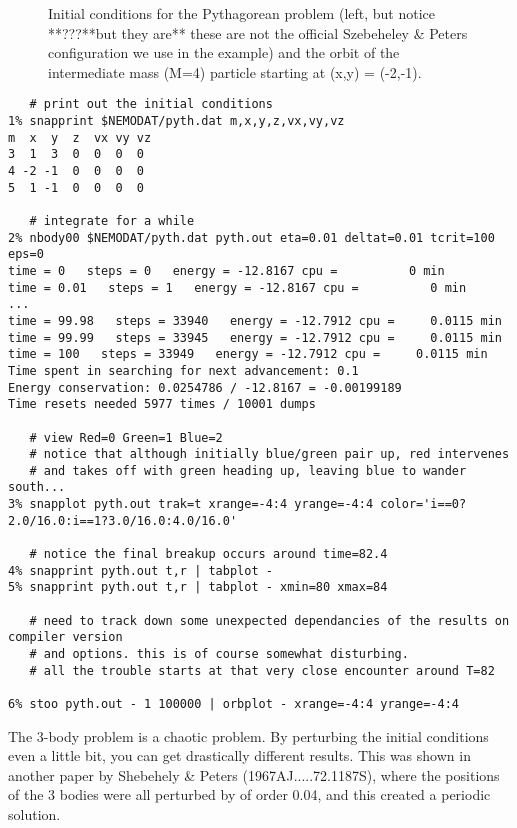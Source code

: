 \begin{figure}[t]
\caption[Pythagorean problem]
{Initial conditions for the Pythagorean problem (left, but notice **???**but they are**
these are not the official Szebeheley \& Peters configuration we use
in the example)
and the orbit of the intermediate mass (M=4) particle starting
at (x,y) = (-2,-1).}
\end{figure}



\footnotesize\begin{verbatim}
   # print out the initial conditions
1% snapprint $NEMODAT/pyth.dat m,x,y,z,vx,vy,vz
m  x  y  z  vx vy vz
3  1  3  0  0  0  0
4 -2 -1  0  0  0  0
5  1 -1  0  0  0  0

   # integrate for a while
2% nbody00 $NEMODAT/pyth.dat pyth.out eta=0.01 deltat=0.01 tcrit=100 eps=0 
time = 0   steps = 0   energy = -12.8167 cpu =          0 min
time = 0.01   steps = 1   energy = -12.8167 cpu =          0 min
...
time = 99.98   steps = 33940   energy = -12.7912 cpu =     0.0115 min
time = 99.99   steps = 33945   energy = -12.7912 cpu =     0.0115 min
time = 100   steps = 33949   energy = -12.7912 cpu =     0.0115 min
Time spent in searching for next advancement: 0.1
Energy conservation: 0.0254786 / -12.8167 = -0.00199189
Time resets needed 5977 times / 10001 dumps

   # view Red=0 Green=1 Blue=2
   # notice that although initially blue/green pair up, red intervenes
   # and takes off with green heading up, leaving blue to wander south...
3% snapplot pyth.out trak=t xrange=-4:4 yrange=-4:4 color='i==0?2.0/16.0:i==1?3.0/16.0:4.0/16.0'

   # notice the final breakup occurs around time=82.4
4% snapprint pyth.out t,r | tabplot -
5% snapprint pyth.out t,r | tabplot - xmin=80 xmax=84

   # need to track down some unexpected dependancies of the results on compiler version
   # and options. this is of course somewhat disturbing.
   # all the trouble starts at that very close encounter around T=82

6% stoo pyth.out - 1 100000 | orbplot - xrange=-4:4 yrange=-4:4 
\end{verbatim}\normalsize

The 3-body problem is a chaotic problem. By perturbing the initial conditions
even a little bit, you can get drastically different results. This was shown
in another paper by Shebehely \& Peters (1967AJ.....72.1187S), where the
positions of the 3 bodies were all perturbed by of order 0.04, and this 
created a periodic solution.


